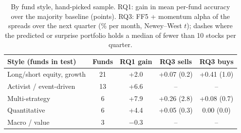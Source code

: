 \begin{table}[t]
  \caption{By fund style, hand-picked sample. RQ1: gain in mean per-fund accuracy over the majority
  baseline (points). RQ3: FF5 + momentum alpha of the spreads over the next quarter (\% per month,
  Newey--West $t$); dashes where the predicted or surprise portfolio holds a median of fewer than 10 stocks per quarter.}
  \label{tab:style}
  \small
  \setlength{\tabcolsep}{3pt}
  \begin{tabular}{@{}lcccc@{}}
    \toprule
    Style (funds in test) & Funds & RQ1 gain & RQ3 sells & RQ3 buys \\
    \midrule
    Long/short equity, growth & 21 & +2.0 & +0.07 (0.2) & +0.41 (1.0) \\
    Activist / event-driven & 13 & +6.6 & -- & -- \\
    Multi-strategy & 6 & +7.9 & +0.26 (2.8) & +0.08 (0.7) \\
    Quantitative & 6 & +4.4 & +0.05 (0.3) & 0.00 (0.0) \\
    Macro / value & 3 & \ensuremath{-}0.3 & -- & -- \\
    \bottomrule
  \end{tabular}
\end{table}
